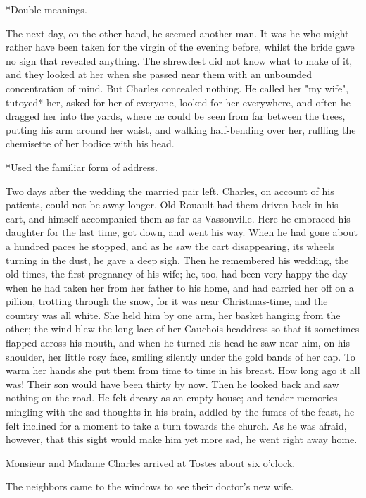 \documentclass{tufte-book}
\begin{document}
     *Double meanings.

The next day, on the other hand, he seemed another man. It was he who
might rather have been taken for the virgin of the evening before,
whilst the bride gave no sign that revealed anything. The shrewdest did
not know what to make of it, and they looked at her when she passed
near them with an unbounded concentration of mind. But Charles concealed
nothing. He called her "my wife", tutoyed* her, asked for her of
everyone, looked for her everywhere, and often he dragged her into the
yards, where he could be seen from far between the trees, putting his
arm around her waist, and walking half-bending over her, ruffling the
chemisette of her bodice with his head.

     *Used the familiar form of address.

Two days after the wedding the married pair left. Charles, on account of
his patients, could not be away longer. Old Rouault had them driven back
in his cart, and himself accompanied them as far as Vassonville. Here
he embraced his daughter for the last time, got down, and went his way.
When he had gone about a hundred paces he stopped, and as he saw the
cart disappearing, its wheels turning in the dust, he gave a deep sigh.
Then he remembered his wedding, the old times, the first pregnancy of
his wife; he, too, had been very happy the day when he had taken her
from her father to his home, and had carried her off on a pillion,
trotting through the snow, for it was near Christmas-time, and the
country was all white. She held him by one arm, her basket hanging from
the other; the wind blew the long lace of her Cauchois headdress so that
it sometimes flapped across his mouth, and when he turned his head he
saw near him, on his shoulder, her little rosy face, smiling silently
under the gold bands of her cap. To warm her hands she put them from
time to time in his breast. How long ago it all was! Their son would
have been thirty by now. Then he looked back and saw nothing on the
road. He felt dreary as an empty house; and tender memories mingling
with the sad thoughts in his brain, addled by the fumes of the feast, he
felt inclined for a moment to take a turn towards the church. As he was
afraid, however, that this sight would make him yet more sad, he went
right away home.

Monsieur and Madame Charles arrived at Tostes about six o'clock.

The neighbors came to the windows to see their doctor's new wife.
\end{document}
